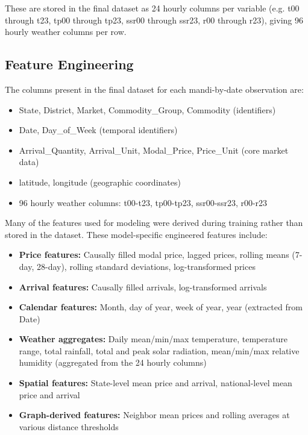 \documentclass[12pt]{article}
\begin{document}
These are stored in the final dataset as 24 hourly columns per variable (e.g. t00 through t23, tp00 through tp23, ssr00 through ssr23, r00 through r23), giving 96 hourly weather columns per row.

\subsection{Feature Engineering}

The columns present in the final dataset for each mandi-by-date observation are:

\begin{itemize}
\item State, District, Market, Commodity\_Group, Commodity (identifiers)
\item Date, Day\_of\_Week (temporal identifiers)
\item Arrival\_Quantity, Arrival\_Unit, Modal\_Price, Price\_Unit (core market data)
\item latitude, longitude (geographic coordinates)
\item 96 hourly weather columns: t00-t23, tp00-tp23, ssr00-ssr23, r00-r23
\end{itemize}

Many of the features used for modeling were derived during training rather than stored in the dataset. These model-specific engineered features include:

\begin{itemize}
\item \textbf{Price features:} Causally filled modal price, lagged prices, rolling means (7-day, 28-day), rolling standard deviations, log-transformed prices
\item \textbf{Arrival features:} Causally filled arrivals, log-transformed arrivals
\item \textbf{Calendar features:} Month, day of year, week of year, year (extracted from Date)
\item \textbf{Weather aggregates:} Daily mean/min/max temperature, temperature range, total rainfall, total and peak solar radiation, mean/min/max relative humidity (aggregated from the 24 hourly columns)
\item \textbf{Spatial features:} State-level mean price and arrival, national-level mean price and arrival
\item \textbf{Graph-derived features:} Neighbor mean prices and rolling averages at various distance thresholds
\end{itemize}
\end{document}
